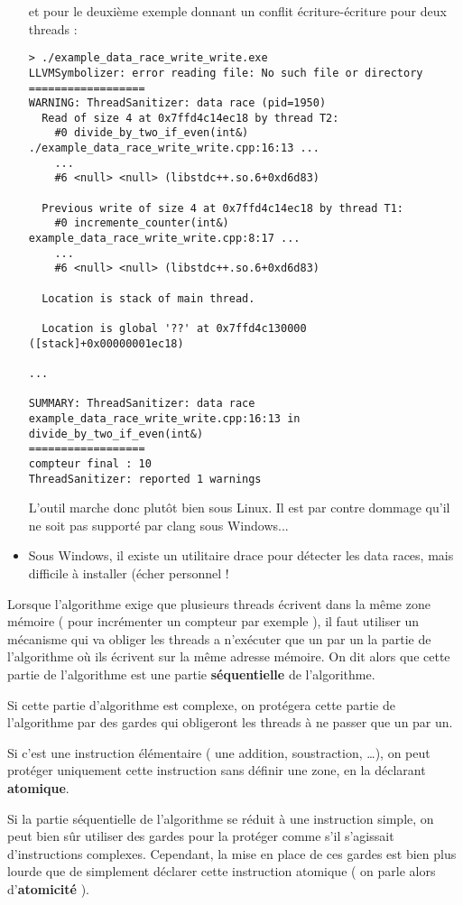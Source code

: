 \documentclass[fleqn,11pt]{article}
\begin{document}
\begin{itemize}
et pour le deuxième exemple donnant un conflit écriture-écriture pour deux threads :
\begin{verbatim}
> ./example_data_race_write_write.exe
LLVMSymbolizer: error reading file: No such file or directory
==================
WARNING: ThreadSanitizer: data race (pid=1950)
  Read of size 4 at 0x7ffd4c14ec18 by thread T2:
    #0 divide_by_two_if_even(int&) ./example_data_race_write_write.cpp:16:13 ...
    ...
    #6 <null> <null> (libstdc++.so.6+0xd6d83)

  Previous write of size 4 at 0x7ffd4c14ec18 by thread T1:
    #0 incremente_counter(int&) example_data_race_write_write.cpp:8:17 ...
    ...
    #6 <null> <null> (libstdc++.so.6+0xd6d83)

  Location is stack of main thread.

  Location is global '??' at 0x7ffd4c130000 ([stack]+0x00000001ec18)

...

SUMMARY: ThreadSanitizer: data race example_data_race_write_write.cpp:16:13 in divide_by_two_if_even(int&)
==================
compteur final : 10
ThreadSanitizer: reported 1 warnings
\end{verbatim}

  L'outil marche donc plutôt bien sous Linux. Il est par contre dommage qu'il ne soit pas supporté par
  clang sous Windows...
\item Sous Windows, il existe un utilitaire drace pour détecter les data races, mais difficile à installer (écher personnel !
\end{itemize}

Lorsque l'algorithme exige que plusieurs threads écrivent dans la même zone mémoire ( pour incrémenter un
compteur par exemple ), il faut utiliser un mécanisme qui va obliger les threads a n'exécuter que un par un
la partie de l'algorithme où ils écrivent sur la même adresse mémoire. On dit alors que cette partie de l'algorithme est une partie \textbf{séquentielle} de l'algorithme.

Si cette partie d'algorithme est complexe, on protégera cette partie de l'algorithme par des gardes qui obligeront les threads à ne passer que un par un.

Si c'est une instruction élémentaire ( une addition, soustraction, \ldots ), on peut protéger uniquement cette instruction sans définir une zone, en la déclarant \textbf{atomique}.

Si la partie séquentielle de l'algorithme se réduit à une instruction simple, on peut bien sûr utiliser des gardes pour la protéger comme s'il s'agissait d'instructions complexes. Cependant, la mise en place de ces gardes est bien plus lourde que de simplement déclarer cette instruction atomique ( on parle alors d'\textbf{atomicité} ).
\end{document}
